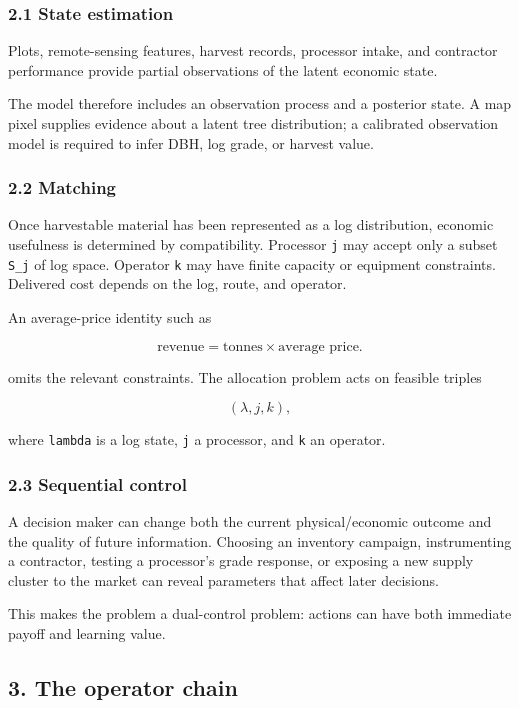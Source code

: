 \subsubsection{2.1 State estimation}\label{state-estimation}

Plots, remote-sensing features, harvest records, processor intake, and contractor
performance provide partial observations of the latent economic state.

The model therefore includes an observation process and a posterior state. A map
pixel supplies evidence about a latent tree distribution; a calibrated
observation model is required to infer DBH, log grade, or harvest value.

\subsubsection{2.2 Matching}\label{matching}

Once harvestable material has been represented as a log distribution, economic
usefulness is determined by compatibility. Processor \texttt{j} may accept only a
subset \texttt{S\_j} of log space. Operator \texttt{k} may have finite capacity or equipment
constraints. Delivered cost depends on the log, route, and operator.

An average-price identity such as

\[
\text{revenue} = \text{tonnes} \times \text{average price}.
\]

omits the relevant constraints. The allocation problem acts on feasible triples

\[
(\lambda, j, k),
\]

where \texttt{lambda} is a log state, \texttt{j} a processor, and \texttt{k} an operator.

\subsubsection{2.3 Sequential control}\label{sequential-control}

A decision maker can change both the current physical/economic outcome and the
quality of future information. Choosing an inventory campaign, instrumenting a
contractor, testing a processor's grade response, or exposing a new supply
cluster to the market can reveal parameters that affect later decisions.

This makes the problem a dual-control problem: actions can have both immediate
payoff and learning value.

\subsection{3. The operator chain}\label{the-operator-chain}


